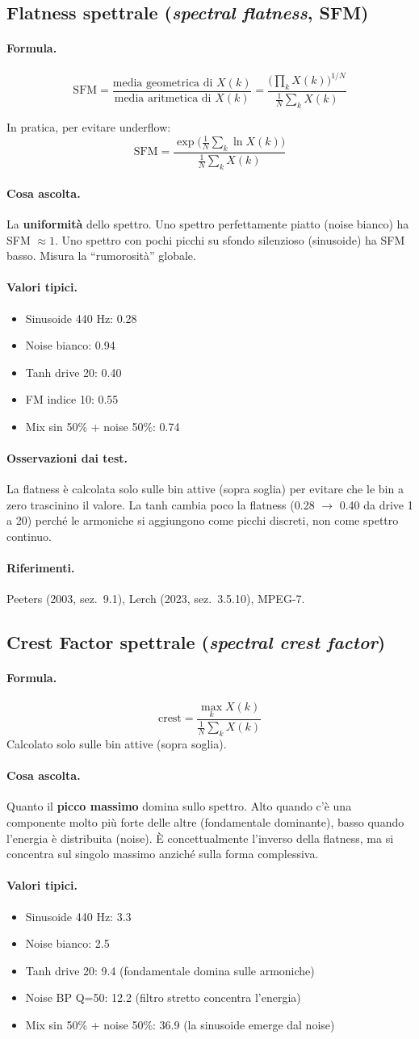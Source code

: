 \documentclass[a4paper,11pt]{article}
\newcommand{\desc}[1]{\subsection{#1}}
\newcommand{\formula}{\paragraph{Formula.}}
\newcommand{\ascolta}{\paragraph{Cosa ascolta.}}
\newcommand{\range}{\paragraph{Valori tipici.}}
\newcommand{\rif}{\paragraph{Riferimenti.}}
\newcommand{\oss}{\paragraph{Osservazioni dai test.}}
\begin{document}
\desc{Flatness spettrale (\emph{spectral flatness}, SFM)}

\formula
\[
  \text{SFM} = \frac{\text{media geometrica di } X(k)}
                     {\text{media aritmetica di } X(k)}
  = \frac{\Big(\prod_{k} X(k)\Big)^{1/N}}
         {\frac{1}{N}\sum_{k} X(k)}
\]

In pratica, per evitare underflow:
\[
  \text{SFM} = \frac{\exp\!\Big(\frac{1}{N}\sum_k \ln X(k)\Big)}
                     {\frac{1}{N}\sum_k X(k)}
\]

\ascolta
La \textbf{uniformità} dello spettro. Uno spettro perfettamente piatto
(noise bianco) ha SFM $\approx 1$. Uno spettro con pochi picchi su sfondo
silenzioso (sinusoide) ha SFM basso. Misura la ``rumorosità'' globale.

\range
\begin{itemize}[nosep]
  \item Sinusoide 440 Hz: 0.28
  \item Noise bianco: 0.94
  \item Tanh drive 20: 0.40
  \item FM indice 10: 0.55
  \item Mix sin 50\% + noise 50\%: 0.74
\end{itemize}

\oss La flatness è calcolata solo sulle bin attive (sopra soglia) per
evitare che le bin a zero trascinino il valore. La tanh cambia poco la
flatness (0.28 $\to$ 0.40 da drive 1 a 20) perché le armoniche si
aggiungono come picchi discreti, non come spettro continuo.

\rif Peeters (2003, sez.~9.1), Lerch (2023, sez.~3.5.10), MPEG-7.

\desc{Crest Factor spettrale (\emph{spectral crest factor})}

\formula
\[
  \text{crest} = \frac{\max_k X(k)}{\frac{1}{N}\sum_k X(k)}
\]
Calcolato solo sulle bin attive (sopra soglia).

\ascolta
Quanto il \textbf{picco massimo} domina sullo spettro.  Alto quando c'è
una componente molto più forte delle altre (fondamentale dominante),
basso quando l'energia è distribuita (noise). È concettualmente
l'inverso della flatness, ma si concentra sul singolo massimo anziché
sulla forma complessiva.

\range
\begin{itemize}[nosep]
  \item Sinusoide 440 Hz: 3.3
  \item Noise bianco: 2.5
  \item Tanh drive 20: 9.4 (fondamentale domina sulle armoniche)
  \item Noise BP Q=50: 12.2 (filtro stretto concentra l'energia)
  \item Mix sin 50\% + noise 50\%: 36.9 (la sinusoide emerge dal noise)
\end{itemize}
\end{document}
